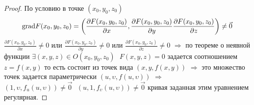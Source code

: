 \begin{proof}
  По условию в точке $(x_0, y_0, z_0)$
  $$
  \mathrm{grad} F(x_0, y_0, z_0) = \left( \frac{\partial F(x_0, y_0, z_0)}{\partial x},
  \frac{\partial F(x_0, y_0, z_0)}{\partial y}
  \frac{\partial F(x_0, y_0, z_0)}{\partial z} \right) \not= \vec 0
  $$
  $\frac{\partial F(x_0, y_0, z_0)}{\partial x} \not= 0$ или
  $\frac{\partial F(x_0, y_0, z_0)}{\partial y} \not= 0$ или
  $\frac{\partial F(x_0, y_0, z_0)}{\partial z} \not= 0$ $\Rightarrow$
  по теореме о неявной функции $\exists (x, y, z) \in O(x_0, y_0, z_0) ~~~
  F(x, y, z) = 0$ задается соотношением $z = f(x,y)$
  то есть состоит из точек вида $(x, y, f(x, y))$ $\Rightarrow$ это множество
  точек задается параметрически $(u, \upsilon, f(u, \upsilon))$
  $\Rightarrow$ $(1, \upsilon, f_u(u, \upsilon)) \not= \vec 0 ~~~
  (u, 1, f_{\upsilon}(u, \upsilon)) \not= \vec 0$ кривая
  заданная этим уравнением регулярная.
\end{proof}